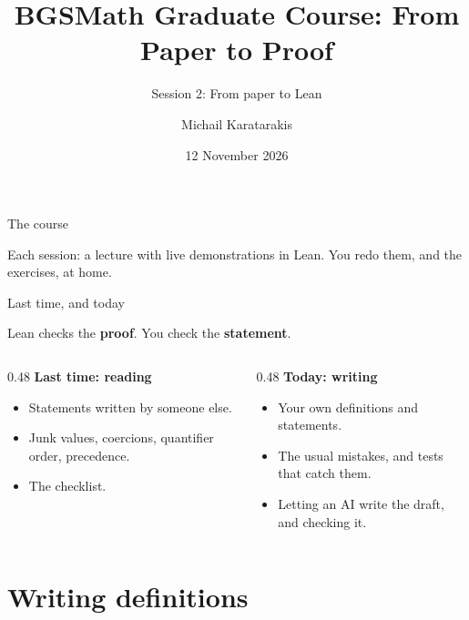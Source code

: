 \documentclass[10pt, aspectratio=169]{beamer}
\title{BGSMath Graduate Course: From Paper to Proof}
\subtitle{Session 2: From paper to Lean}
\author{Michail Karatarakis}
\institute{Radboud University Nijmegen \& Axiomatic AI}
\date{12 November 2026}
\begin{document}
\maketitle

\begin{frame}[fragile]{The course}

\vspace{0.4em}
Each session: a lecture with live demonstrations in Lean. You redo them, and the exercises, at home.
\end{frame}

\begin{frame}[fragile]{Last time, and today}
\begin{keypoint}
Lean checks the \textbf{proof}. You check the \textbf{statement}.
\end{keypoint}

\vspace{0.8em}
\begin{columns}[T]
\begin{column}{0.48\textwidth}
\textbf{\color{leanblue}Last time: reading}
\begin{itemize}
\item Statements written by someone else.
\item Junk values, coercions, quantifier order, precedence.
\item The checklist.
\end{itemize}
\end{column}
\begin{column}{0.48\textwidth}
\textbf{\color{leanblue}Today: writing}
\begin{itemize}
\item Your own definitions and statements.
\item The usual mistakes, and tests that catch them.
\item Letting an AI write the draft, and checking it.
\end{itemize}
\end{column}
\end{columns}
\end{frame}

\section{Writing definitions}
\end{document}

